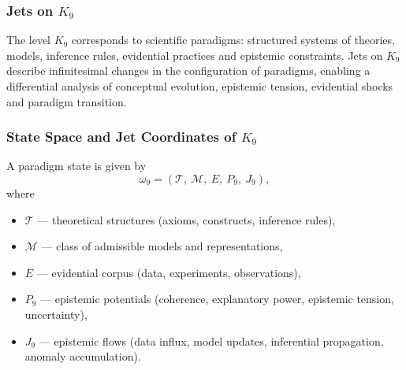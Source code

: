 
\subsubsection{Jets on \texorpdfstring{$K_9$}{K_9}}
\label{sec:jets-k9}

The level $K_9$ corresponds to scientific paradigms: structured systems
of theories, models, inference rules, evidential practices and epistemic
constraints. Jets on $K_9$ describe infinitesimal changes in the
configuration of paradigms, enabling a differential analysis of
conceptual evolution, epistemic tension, evidential shocks and paradigm
transition.


\subsubsection{State Space and Jet Coordinates of \texorpdfstring{$K_9$}{K_9}}

A paradigm state is given by
\[
\omega_9 =
(\mathcal{T},\ \mathcal{M},\ E,\ P_9,\ J_9),
\]
where
\begin{itemize}
    \item $\mathcal{T}$ — theoretical structures (axioms, constructs,
          inference rules),
    \item $\mathcal{M}$ — class of admissible models and representations,
    \item $E$ — evidential corpus (data, experiments, observations),
    \item $P_9$ — epistemic potentials (coherence, explanatory power,
          epistemic tension, uncertainty),
    \item $J_9$ — epistemic flows (data influx, model updates,
          inferential propagation, anomaly accumulation).
\end{itemize}

